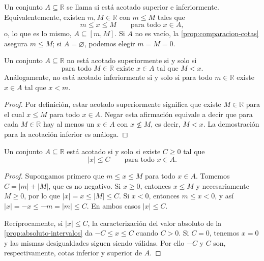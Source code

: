\begin{samepage}
\begin{definition}
\label{def:conjunto-acotado}
Un conjunto $A\subseteq\mathbb{R}$ se llama  si está acotado superior e inferiormente. Equivalentemente, existen $m,M\in\mathbb{R}$ con $m\leq M$ tales que
\[
 m\leq x\leq M\qquad\text{para todo }x\in A,
\]
o, lo que es lo mismo, $A\subseteq[m,M]$.
Si $A$ no es vacío, la \cref{prop:comparacion-cotas} asegura $m\leq M$; si $A=\varnothing$, podemos elegir $m=M=0$.
\end{definition}
\end{samepage}

\begin{samepage}
\begin{proposition}
\label{prop:no-acotacion}
Un conjunto $A\subseteq\mathbb{R}$ no está acotado superiormente si y solo si
\[
 \text{para todo }M\in\mathbb{R}\text{ existe }x\in A\text{ tal que }M<x.
\]
Análogamente, no está acotado inferiormente si y solo si para todo $m\in\mathbb{R}$ existe $x\in A$ tal que $x<m$.
\end{proposition}
\end{samepage}

\begin{proof}
Por definición, estar acotado superiormente significa que existe $M\in\mathbb{R}$ para el cual $x\leq M$ para todo $x\in A$. Negar esta afirmación equivale a decir que para cada $M\in\mathbb{R}$ hay al menos un $x\in A$ con $x\not\leq M$, es decir, $M<x$. La demostración para la acotación inferior es análoga.
\end{proof}

\begin{samepage}
\begin{proposition}
\label{prop:acotacion-absoluto}
Un conjunto $A\subseteq\mathbb{R}$ está acotado si y solo si existe $C\geq0$ tal que
\[
 |x|\leq C\qquad\text{para todo }x\in A.
\]
\end{proposition}
\end{samepage}

\begin{proof}
Supongamos primero que $m\leq x\leq M$ para todo $x\in A$. Tomemos $C=|m|+|M|$, que es no negativo. Si $x\geq0$, entonces $x\leq M$ y necesariamente $M\geq0$, por lo que $|x|=x\leq |M|\leq C$. Si $x<0$, entonces $m\leq x<0$, y así $|x|=-x\leq -m=|m|\leq C$. En ambos casos $|x|\leq C$.

Recíprocamente, si $|x|\leq C$, la caracterización del valor absoluto de la \cref{prop:absoluto-intervalos} da $-C\leq x\leq C$ cuando $C>0$. Si $C=0$, tenemos $x=0$ y las mismas desigualdades siguen siendo válidas. Por ello $-C$ y $C$ son, respectivamente, cotas inferior y superior de $A$.
\end{proof}

